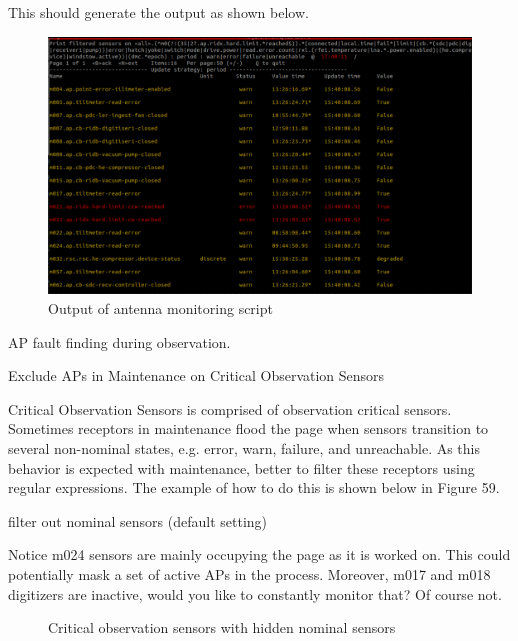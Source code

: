 This should generate the output as shown below.



\begin{figure}[H]
	\centering
	\includegraphics[scale=0.23]{Chapters/images/image124.png}
	
	\caption{Output of antenna monitoring script}
	\label{fig:image124}
\end{figure}


AP fault finding during observation.

Exclude APs in Maintenance on Critical Observation Sensors

Critical Observation Sensors is comprised of observation critical sensors. Sometimes receptors in maintenance flood the page when sensors transition to several non-nominal states, e.g. error, warn, failure, and unreachable. As this behavior is expected with maintenance, better to filter these receptors using regular expressions.  The example of how to do this is shown below in Figure 59.

filter out nominal sensors (default setting)

Notice m024 sensors are mainly occupying the page as it is worked on. This could potentially mask a set of active APs in the process. Moreover, m017 and m018 digitizers are inactive, would you like to constantly monitor that? Of course not.



\begin{figure}[!thb]
	\centering
	
	\caption{Critical observation sensors with hidden nominal sensors}
	\label{fig:image120}
\end{figure}

